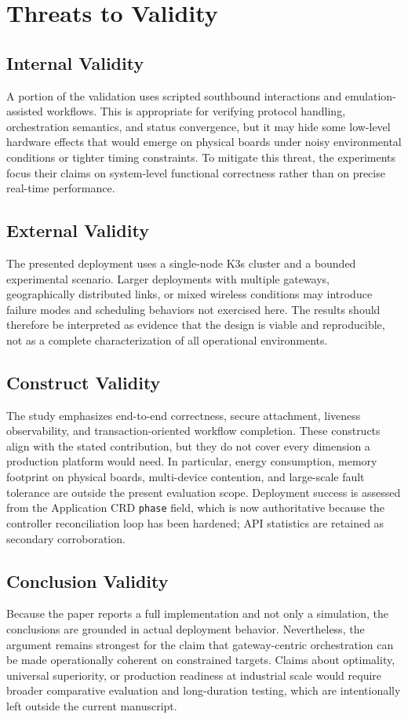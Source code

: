 \section{Threats to Validity}

\subsection{Internal Validity}
A portion of the validation uses scripted southbound interactions and emulation-assisted workflows. This is appropriate for verifying protocol handling, orchestration semantics, and status convergence, but it may hide some low-level hardware effects that would emerge on physical boards under noisy environmental conditions or tighter timing constraints. To mitigate this threat, the experiments focus their claims on system-level functional correctness rather than on precise real-time performance.

\subsection{External Validity}
The presented deployment uses a single-node K3s cluster and a bounded experimental scenario. Larger deployments with multiple gateways, geographically distributed links, or mixed wireless conditions may introduce failure modes and scheduling behaviors not exercised here. The results should therefore be interpreted as evidence that the design is viable and reproducible, not as a complete characterization of all operational environments.

\subsection{Construct Validity}
The study emphasizes end-to-end correctness, secure attachment, liveness observability, and transaction-oriented workflow completion. These constructs align with the stated contribution, but they do not cover every dimension a production platform would need. In particular, energy consumption, memory footprint on physical boards, multi-device contention, and large-scale fault tolerance are outside the present evaluation scope. Deployment success is assessed from the Application CRD \texttt{phase} field, which is now authoritative because the controller reconciliation loop has been hardened; API statistics are retained as secondary corroboration.

\subsection{Conclusion Validity}
Because the paper reports a full implementation and not only a simulation, the conclusions are grounded in actual deployment behavior. Nevertheless, the argument remains strongest for the claim that gateway-centric orchestration can be made operationally coherent on constrained targets. Claims about optimality, universal superiority, or production readiness at industrial scale would require broader comparative evaluation and long-duration testing, which are intentionally left outside the current manuscript.
